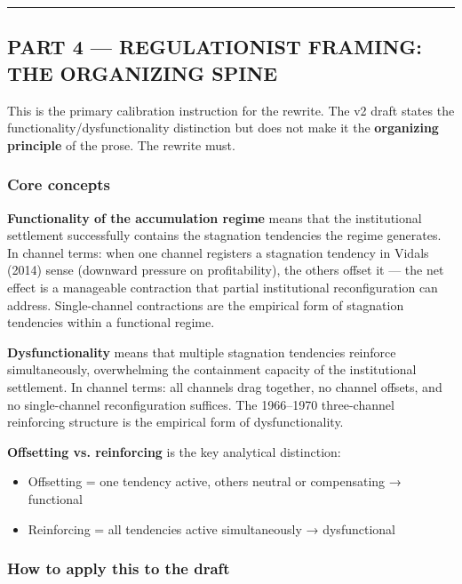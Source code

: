 \begin{center}\rule{0.5\linewidth}{0.5pt}\end{center}

\subsection{PART 4 --- REGULATIONIST FRAMING: THE ORGANIZING
SPINE}\label{part-4--regulationist-framing-the-organizing-spine}

This is the primary calibration instruction for the rewrite. The v2
draft states the functionality/dysfunctionality distinction but does not
make it the \textbf{organizing principle} of the prose. The rewrite
must.

\subsubsection{Core concepts}\label{core-concepts}

\textbf{Functionality of the accumulation regime} means that the
institutional settlement successfully contains the stagnation tendencies
the regime generates. In channel terms: when one channel registers a
stagnation tendency in Vidal\textquotesingle s (2014) sense (downward
pressure on profitability), the others offset it --- the net effect is a
manageable contraction that partial institutional reconfiguration can
address. Single-channel contractions are the empirical form of
stagnation tendencies within a functional regime.

\textbf{Dysfunctionality} means that multiple stagnation tendencies
reinforce simultaneously, overwhelming the containment capacity of the
institutional settlement. In channel terms: all channels drag together,
no channel offsets, and no single-channel reconfiguration suffices. The
1966--1970 three-channel reinforcing structure is the empirical form of
dysfunctionality.

\textbf{Offsetting vs. reinforcing} is the key analytical distinction:

\begin{itemize}
\tightlist
\item
  Offsetting = one tendency active, others neutral or compensating →
  functional
\item
  Reinforcing = all tendencies active simultaneously → dysfunctional
\end{itemize}

\subsubsection{How to apply this to the
draft}\label{how-to-apply-this-to-the-draft}

